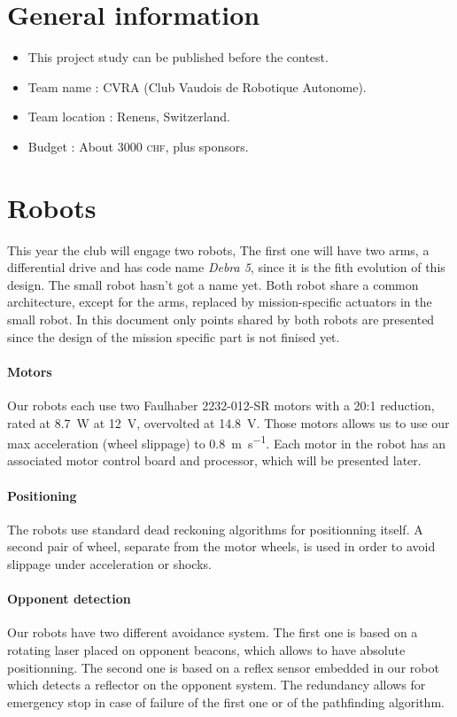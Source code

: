 \documentclass[a4paper]{paper}
\begin{document}


\section{General information}
\begin{itemize}
    \item This project study can be published before the contest.
    \item Team name : CVRA (Club Vaudois de Robotique Autonome).
    \item Team location : Renens, Switzerland.
    \item Budget : About 3000 \textsc{chf}, plus sponsors.
\end{itemize}

\section{Robots}
This year the club will engage two robots,
The first one will have two arms, a differential drive and has code name \textit{Debra 5}, since it is the fith evolution of this design.
The small robot hasn't got a name yet.
Both robot share a common architecture, except for the arms, replaced by mission-specific actuators in the small robot.
In this document only points shared by both robots are presented since the design of the mission specific part is not finised yet.

\paragraph{Motors}
Our robots each use two Faulhaber 2232-012-SR motors with a 20:1 reduction, rated at \SI{8.7}{\watt} at \SI{12}{\volt}, overvolted at \SI{14.8}{\volt}.
Those motors allows us to use our max acceleration (wheel slippage) to \SI{0.8}{\meter\per\second}.
Each motor in the robot has an associated motor control board and processor, which will be presented later.

\paragraph{Positioning}
The robots use standard dead reckoning algorithms for positionning itself.
A second pair of wheel, separate from the motor wheels, is used in order to avoid slippage under acceleration or shocks.

\paragraph{Opponent detection}
Our robots have two different avoidance system.
The first one is based on a rotating laser placed on opponent beacons, which allows to have absolute positionning.
The second one is based on a reflex sensor embedded in our robot which detects a reflector on the opponent system.
The redundancy allows for emergency stop in case of failure of the first one or of the pathfinding algorithm.
\end{document}
